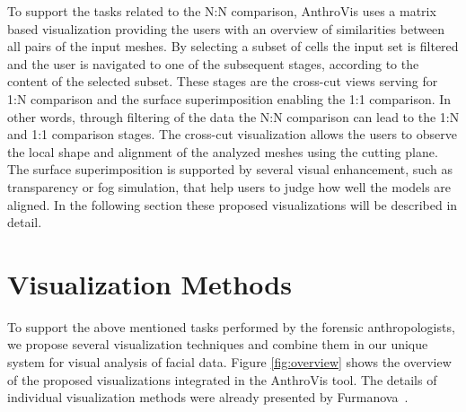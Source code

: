 \documentclass[final,5p,times]{elsarticle}
\begin{document}
To support the tasks related to the N:N comparison, AnthroVis uses a matrix based visualization providing the users with an overview of similarities between all pairs of the input meshes.
By selecting a subset of cells the input set is filtered and the user is navigated to one of the subsequent stages, according to the content of the selected subset.
These stages are the cross-cut views serving for 1:N comparison and the surface superimposition enabling the 1:1 comparison.
In other words, through filtering of the data the N:N comparison can lead to the 1:N and 1:1 comparison stages.
The cross-cut visualization allows the users to observe the local shape and alignment of the analyzed meshes using the cutting plane.
The surface superimposition is supported by several visual enhancement, such as transparency or fog simulation, that help users to judge how well the models are aligned.
In the following section these proposed visualizations will be described in detail.

\section{Visualization Methods} \label{exface}
To support the above mentioned tasks performed by the forensic anthropologists, we propose several visualization techniques and combine them in our unique system for visual analysis of facial data.
Figure \ref{fig:overview} shows the overview of the proposed visualizations integrated in the AnthroVis tool.
The details of individual visualization methods were already presented by Furmanova~\cite{Furmanova2015}.
\end{document}
